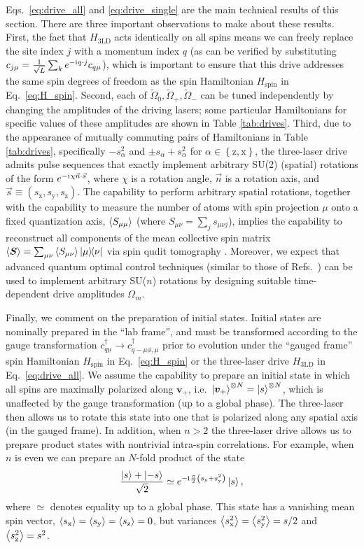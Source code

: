\documentclass[nofootinbib,twocolumn]{revtex4-2}
\renewcommand{\t}{\text} %
\newcommand{\p}[1]{\left(#1\right)} %
\renewcommand{\set}[1]{\left\{#1\right\}} %
\newcommand{\bk}{\Braket} %
\renewcommand{\v}{\bm} %
\renewcommand{\c}{\cdot} %
\renewcommand{\i}{\mathrm{i}\mkern1mu} %
\newcommand{\1}{\mathds{1}}
\newcommand{\x}{\text{x}}
\newcommand{\y}{\text{y}}
\newcommand{\z}{\text{z}}
\newcommand{\spin}{\text{spin}}
\begin{document}
Eqs.~\eqref{eq:drive_all} and \eqref{eq:drive_single} are the main technical results of this section.
There are three important observations to make about these results.
First, the fact that $H_{\t{3LD}}$ acts identically on all spins means we can freely replace the site index $j$ with a momentum index $q$ (as can be verified by substituting $c_{j\mu}=\frac1{\sqrt{L}}\sum_k e^{-\i q\c j} c_{q\mu}$), which is important to ensure that this drive addresses the same spin degrees of freedom as the spin Hamiltonian $H_\spin$ in Eq.~\eqref{eq:H_spin}.
Second, each of $\tilde\Omega_0,\tilde\Omega_+,\tilde\Omega_-$ can be tuned independently by changing the amplitudes of the driving lasers; some particular Hamiltonians for specific values of these amplitudes are shown in Table \ref{tab:drives}.
Third, due to the appearance of mutually commuting pairs of Hamiltonians in Table \ref{tab:drives}, specifically $-s_\alpha^2$ and $\pm s_\alpha+s_\alpha^2$ for $\alpha\in\set{\z,\x}$, the three-laser drive admits pulse sequences that exactly implement arbitrary SU(2) (spatial) rotations of the form $e^{-\i\chi\vec n\c\vec s}$, where $\chi$ is a rotation angle, $\vec n$ is a rotation axis, and $\vec s\equiv(s_\x,s_\y,s_\z)$.
The capability to perform arbitrary spatial rotations, together with the capability to measure the number of atoms with spin projection $\mu$ onto a fixed quantization axis, $\bk{S_{\mu\mu}}$ (where $S_{\mu\nu}=\sum_js_{\mu\nu j}$), implies the capability to reconstruct all components of the mean collective spin matrix $\bk{\v S}=\sum_{\mu\nu}\bk{S_{\mu\nu}}\op{\mu}{\nu}$ via spin qudit tomography \cite{newton1968measurability, perlin2020qudit}.
Moreover, we expect that advanced quantum optimal control techniques (similar to those of Refs.~\cite{anderson2015accurate, lucarelli2018quantum}) can be used to implement arbitrary SU($n$) rotations by designing suitable time-dependent drive amplitudes $\Omega_m$.

Finally, we comment on the preparation of initial states.
Initial states are nominally prepared in the ``lab frame'', and must be transformed according to the gauge transformation $c_{q\mu}^\dag\to c_{q-\mu\phi,\mu}^\dag$ prior to evolution under the ``gauged frame'' spin Hamiltonian $H_\spin$ in Eq.~\eqref{eq:H_spin} or the three-laser drive $H_{\t{3LD}}$ in Eq.~\eqref{eq:drive_all}.
We assume the capability to prepare an initial state in which all spins are maximally polarized along $\v v_+$, i.e.~$\ket{\v v_+}^{\otimes N}=\ket{s}^{\otimes N}$, which is unaffected by the gauge transformation (up to a global phase).
The three-laser then allows us to rotate this state into one that is polarized along any spatial axis (in the gauged frame).
In addition, when $n>2$ the three-laser drive allows us to prepare product states with nontrivial intra-spin correlations.
For example, when $n$ is even we can prepare an $N$-fold product of the state
\begin{align}
  \frac{\ket{s} + \ket{-s}}{\sqrt{2}}
  \simeq e^{-\i\frac{\pi}{2}\p{s_\y + s_\y^2}} \ket{s},
\end{align}
where $\simeq$ denotes equality up to a global phase.
This state has a vanishing mean spin vector, $\bk{s_\x}=\bk{s_\y}=\bk{s_\z}=0$, but variances $\bk{s_\x^2}=\bk{s_\y^2}=s/2$ and $\bk{s_\z^2}=s^2$.
\end{document}
